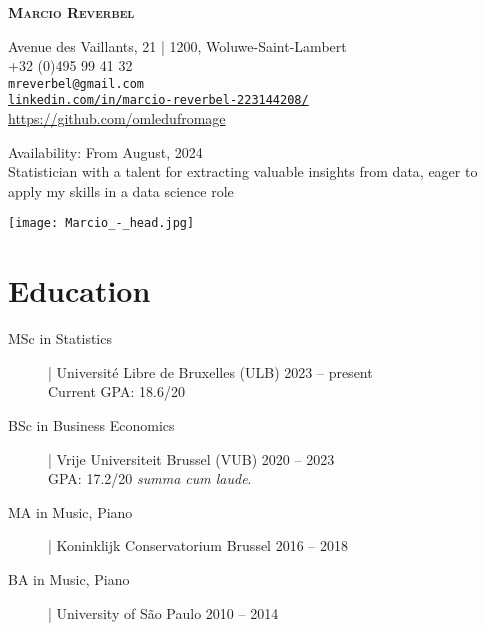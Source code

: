 \documentclass[11pt, a4paper, sans]{article}
\newcommand{\mycolor}{mySlateBlue}           %
\newcommand{\thesectionicon}{}
\newcommand{\sectionicon}[1]{\renewcommand{\thesectionicon}{#1}}
\newcommand{\adjust}{\vspace{-1.01ex}}
\begin{document}
\begin{minipage}{0.65\textwidth}
\vspace{0pt}
\begin{flushleft}
\begin{small}

  {\sffamily\bfseries\scshape\huge
    Marcio Reverbel}

\vspace{2ex}       
  \textcolor{\mycolor}{\faHome} Avenue des Vaillants, 21 | 1200, Woluwe-Saint-Lambert\\
  \textcolor{\mycolor}{\faPhone} +32 (0)495 99 41 32\\
  \textcolor{\mycolor}{\faEnvelope} \texttt{mreverbel@gmail.com}\\
  \textcolor{\mycolor}{\faLinkedin} \href{https://linkedin.com/in/marcio-reverbel-223144208/}{\texttt{linkedin.com/in/marcio-reverbel-223144208/}}\\
  \textcolor{\mycolor}{\faGithub} \url{https://github.com/omledufromage}
  
  \vspace{1ex}
  \textcolor{\mycolor}{Availability:} From August, 2024 \\
Statistician with a talent for extracting valuable insights from data, eager to apply my skills in a data science role 
\end{small}
\end{flushleft}
\end{minipage}%
%
\begin{minipage}{0.35\textwidth}
\begin{flushright}
    \texttt{[image: Marcio\_-\_head.jpg]}
    \label{img:g}
\end{flushright}
\end{minipage}

\section{Education}
\begin{description}
\item[\textcolor{\mycolor}{MSc in Statistics}] | Université Libre de Bruxelles (ULB)
  \hfill 2023 -- present \\
  Current GPA: 18.6/20
  \adjust

\item[\textcolor{\mycolor}{BSc in Business Economics}] | Vrije Universiteit Brussel (VUB)
  \hfill  2020 -- 2023\\
  GPA: 17.2/20 \emph{summa cum laude}.
  \adjust

\item[\textcolor{\mycolor}{MA in Music, Piano}] | Koninklijk Conservatorium Brussel
  \hfill 2016 -- 2018\adjust

\item[\textcolor{\mycolor}{BA in Music, Piano}] | University of São Paulo
  \hfill 2010 -- 2014
\end{description} 
\sectionicon{\faToolbox}
\end{document}
